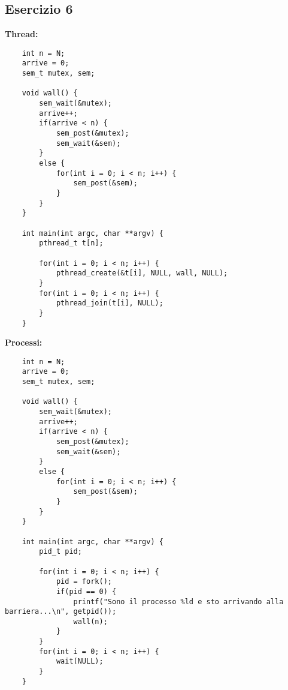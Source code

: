 \documentclass[12pt]{article}
\begin{document}
\subsection*{Esercizio 6}
\textbf{Thread:}
\begin{lstlisting}
    int n = N;
    arrive = 0;
    sem_t mutex, sem;

    void wall() {
        sem_wait(&mutex);
        arrive++;
        if(arrive < n) {
            sem_post(&mutex);
            sem_wait(&sem);
        }
        else {
            for(int i = 0; i < n; i++) {
                sem_post(&sem);
            }
        }
    }

    int main(int argc, char **argv) {
        pthread_t t[n];

        for(int i = 0; i < n; i++) {
            pthread_create(&t[i], NULL, wall, NULL);
        }
        for(int i = 0; i < n; i++) {
            pthread_join(t[i], NULL);
        }
    }
\end{lstlisting}
\textbf{Processi:}
\begin{lstlisting}
    int n = N;
    arrive = 0;
    sem_t mutex, sem;

    void wall() {
        sem_wait(&mutex);
        arrive++;
        if(arrive < n) {
            sem_post(&mutex);
            sem_wait(&sem);
        }
        else {
            for(int i = 0; i < n; i++) {
                sem_post(&sem);
            }
        }
    }

    int main(int argc, char **argv) {
        pid_t pid;

        for(int i = 0; i < n; i++) {
            pid = fork();
            if(pid == 0) {
                printf("Sono il processo %ld e sto arrivando alla barriera...\n", getpid());
                wall(n);
            }
        }
        for(int i = 0; i < n; i++) {
            wait(NULL);
        }
    }
\end{lstlisting}
\end{document}
